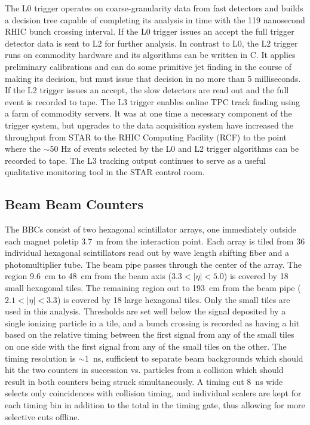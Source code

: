 The L0 trigger operates on coarse-granularity data from fast detectors and
builds a decision tree capable of completing its analysis in time with the 119
nanosecond RHIC bunch crossing interval. If the L0 trigger issues an accept
the full trigger detector data is sent to L2 for further analysis. In contrast
to L0, the L2 trigger runs on commodity hardware and its algorithms can be
written in C. It applies preliminary calibrations and can do some primitive
jet finding in the course of making its decision, but must issue that decision
in no more than 5 milliseconds. If the L2 trigger issues an accept, the slow
detectors are read out and the full event is recorded to tape. The L3 trigger
\cite{Adler:2002ab} enables online TPC track finding using a farm of commodity
servers. It was at one time a necessary component of the trigger system, but
upgrades to the data acquisition system have increased the throughput from
STAR to the RHIC Computing Facility (RCF) to the point where the $\sim$50 Hz
of events selected by the L0 and L2 trigger algorithms can be recorded to
tape. The L3 tracking output continues to serve as a useful qualitative
monitoring tool in the STAR control room.

\subsection{Beam Beam Counters}

The BBCs \cite{Kiryluk:2003aw} consist of two hexagonal scintillator arrays,
one immediately outside each magnet poletip 3.7~m from the interaction point.
Each array is tiled from 36 individual hexagonal scintillators read out by
wave length shifting fiber and a photomultiplier tube. The beam pipe passes
through the center of the array. The region 9.6~cm to 48~cm from the beam axis
($3.3 < |\eta| < 5.0$) is covered by 18 small hexagonal tiles. The remaining
region out to 193~cm from the beam pipe ($2.1 < |\eta| < 3.3$) is covered by
18 large hexagonal tiles. Only the small tiles are used in this analysis.
Thresholds are set well below the signal deposited by a single ionizing
particle in a tile, and a bunch crossing is recorded as having a hit based on
the relative timing between the first signal from any of the small tiles on
one side with the first signal from any of the small tiles on the other. The
timing resolution is $\sim$1~ns, sufficient to separate beam backgrounds which
should hit the two counters in succession vs. particles from a collision which
should result in both counters being struck simultaneously. A timing cut 8~ns
wide selects only coincidences with collision timing, and individual scalers
are kept for each timing bin in addition to the total in the timing gate, thus
allowing for more selective cuts offline.

